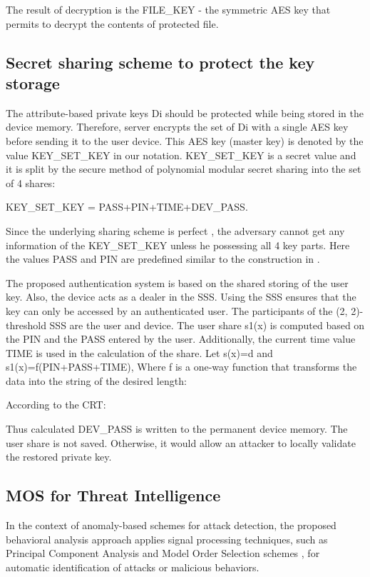 \documentclass[twocolumn]{svjour3}          %
\begin{document}
The result of decryption is the FILE\_KEY - the symmetric AES key that permits to decrypt the contents of protected file. 

\subsection{Secret sharing scheme to protect the key storage }
\label{sec_secret}

The attribute-based private keys Di should be protected while being stored in the device memory. Therefore, server encrypts the set of Di with a single AES key before sending it to the user device. This AES key (master key) is denoted by the value KEY\_SET\_KEY in our notation. KEY\_SET\_KEY is a secret value and it is split by the secure method of polynomial modular secret sharing \cite{galibus2015mobile, galibus2008some} into the set of 4 shares:

KEY\_SET\_KEY = PASS+PIN+TIME+DEV\_PASS. 

Since the underlying sharing scheme is perfect \cite{galibus2008some}, the adversary cannot get any information of the KEY\_SET\_KEY unless he possessing all 4 key parts. Here the values PASS and PIN are predefined similar to the construction in \cite{galibus2015mobile}.

The proposed authentication system is based on the shared storing of the user key. Also, the device acts as a dealer in the SSS. Using the SSS ensures that the key can only be accessed by an authenticated user. The participants of the (2, 2)-threshold SSS are the user and device. The user share s1(x) is computed based on the PIN and the PASS entered by the user. Additionally, the current time value TIME is used in the calculation of the share. Let s(x)=d and s1(x)=f(PIN+PASS+TIME), 
Where f is a one-way function that transforms the data into the string of the desired length: 

According to the CRT:

Thus calculated DEV\_PASS is written to the permanent device memory. The user share is not saved. Otherwise, it would allow an attacker to locally validate the restored private key.

\subsection{MOS for Threat Intelligence}
\label{sec_mos}
In the context of anomaly-based schemes for attack detection, the proposed behavioral analysis approach applies signal processing techniques, such as Principal Component Analysis and Model Order Selection schemes \cite{tenorio2013greatest}, for automatic identification of attacks or malicious behaviors. 
\end{document}
